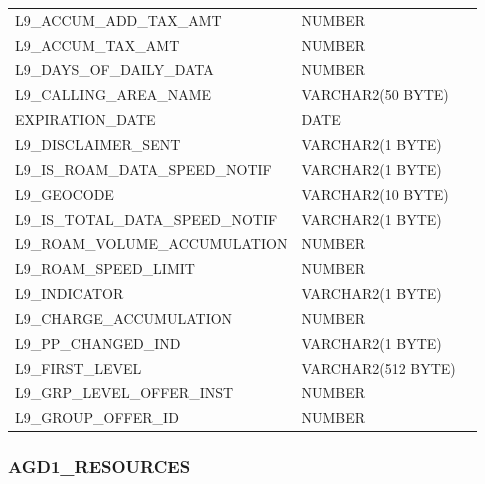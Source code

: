 \documentclass[12pt,twoside]{article}
\begin{document}
\begin{longtable}{lll}
 L9\_ACCUM\_ADD\_TAX\_AMT             &  NUMBER               &               \\
 L9\_ACCUM\_TAX\_AMT                  &  NUMBER               &               \\
 L9\_DAYS\_OF\_DAILY\_DATA            &  NUMBER               &               \\
 L9\_CALLING\_AREA\_NAME              &  VARCHAR2(50 BYTE)    &               \\
 EXPIRATION\_DATE                     &  DATE                 &               \\
 L9\_DISCLAIMER\_SENT                 &  VARCHAR2(1 BYTE)     &               \\
 L9\_IS\_ROAM\_DATA\_SPEED\_NOTIF     &  VARCHAR2(1 BYTE)     &               \\
 L9\_GEOCODE                          &  VARCHAR2(10 BYTE)    &               \\
 L9\_IS\_TOTAL\_DATA\_SPEED\_NOTIF    &  VARCHAR2(1 BYTE)     &               \\
 L9\_ROAM\_VOLUME\_ACCUMULATION       &  NUMBER               &               \\
 L9\_ROAM\_SPEED\_LIMIT               &  NUMBER               &               \\
 L9\_INDICATOR                        &  VARCHAR2(1 BYTE)     &               \\
 L9\_CHARGE\_ACCUMULATION             &  NUMBER               &               \\
 L9\_PP\_CHANGED\_IND                 &  VARCHAR2(1 BYTE)     &               \\
 L9\_FIRST\_LEVEL                     &  VARCHAR2(512 BYTE)   &               \\
 L9\_GRP\_LEVEL\_OFFER\_INST          &  NUMBER               &               \\
 L9\_GROUP\_OFFER\_ID                 &  NUMBER               &               \\
\hline
\end{longtable}

\normalsize
\subsubsection{AGD1\_RESOURCES}
\label{sec-8-3-5}

\scriptsize
\end{document}
